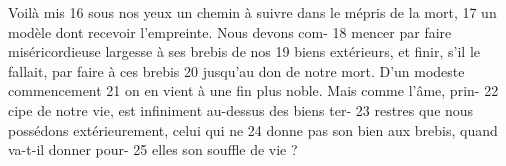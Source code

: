 Voilà mis	 
16	 	sous nos yeux un chemin à suivre dans le mépris de la mort,	 
17	 	un modèle dont recevoir l'empreinte. Nous devons com-	 
18	 	mencer par faire miséricordieuse largesse à ses brebis de nos	 
19	 	biens extérieurs, et finir, s'il le fallait, par faire à ces brebis	 
20	 	jusqu'au don de notre mort. D'un modeste commencement	 
21	 	on en vient à une fin plus noble. Mais comme l'âme, prin-	 
22	 	cipe de notre vie, est infiniment au-dessus des biens ter-	 
23	 	restres que nous possédons extérieurement, celui qui ne	 
24	 	donne pas son bien aux brebis, quand va-t-il donner pour-	 
25	 	elles son souffle de vie ?